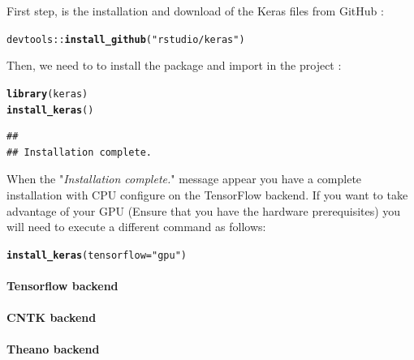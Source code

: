 \documentclass[6pt,letter]{article}\usepackage[]{graphicx}\usepackage[]{color}
\makeatletter
\newcommand{\hlstr}[1]{\textcolor[rgb]{0.192,0.494,0.8}{#1}}%
\newcommand{\hlopt}[1]{\textcolor[rgb]{0,0,0}{#1}}%
\newcommand{\hlstd}[1]{\textcolor[rgb]{0.345,0.345,0.345}{#1}}%
\newcommand{\hlkwc}[1]{\textcolor[rgb]{0.333,0.667,0.333}{#1}}%
\newcommand{\hlkwd}[1]{\textcolor[rgb]{0.737,0.353,0.396}{\textbf{#1}}}%
\newenvironment{kframe}{%
 \def\at@end@of@kframe{}%
 \ifinner\ifhmode%
  \def\at@end@of@kframe{\end{minipage}}%
  \begin{minipage}{\columnwidth}%
 \fi\fi%
 \def\FrameCommand##1{\hskip\@totalleftmargin \hskip-\fboxsep
 \colorbox{shadecolor}{##1}\hskip-\fboxsep
     \hskip-\linewidth \hskip-\@totalleftmargin \hskip\columnwidth}%
 \MakeFramed {\advance\hsize-\width
   \@totalleftmargin\z@ \linewidth\hsize
   \@setminipage}}%
 {\par\unskip\endMakeFramed%
 \at@end@of@kframe}
\newenvironment{knitrout}{}{} %
\makeatother
\begin{document}
First step, is the installation and download of the Keras files from GitHub :
\begin{knitrout}
\color{fgcolor}\begin{kframe}
\begin{alltt}
\hlstd{devtools}\hlopt{::}\hlkwd{install_github}\hlstd{(}\hlstr{"rstudio/keras"}\hlstd{)}
\end{alltt}
\end{kframe}
\end{knitrout}
Then, we need to to install the package and import in the project :
\begin{knitrout}
\color{fgcolor}\begin{kframe}
\begin{alltt}
\hlkwd{library}\hlstd{(keras)}
\hlkwd{install_keras}\hlstd{()}
\end{alltt}
\begin{verbatim}
## 
## Installation complete.
\end{verbatim}
\end{kframe}
\end{knitrout}
When the "\textit{Installation complete.}" message appear you have a complete installation with CPU configure on the TensorFlow backend.
If you want to take advantage of your GPU (Ensure that you have the hardware prerequisites) you will need to execute a different command as follows:
\begin{knitrout}
\color{fgcolor}\begin{kframe}
\begin{alltt}
\hlkwd{install_keras}\hlstd{(}\hlkwc{tensorflow} \hlstd{=} \hlstr{"gpu"}\hlstd{)}
\end{alltt}
\end{kframe}
\end{knitrout}

\paragraph{Tensorflow backend}


\paragraph{CNTK backend}
\paragraph{Theano backend}
\end{document}
